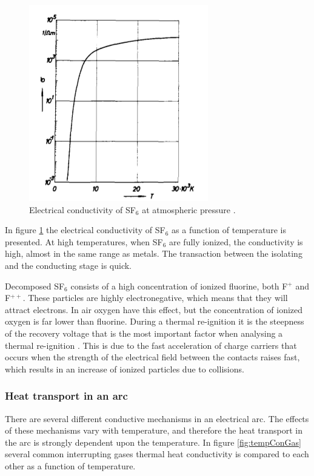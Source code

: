 \documentclass[10pt,a4paper,twoside]{article}
\begin{document}
\begin{figure}[H]
\centering
\includegraphics[scale=0.5]{Bilder/Theory/SF6Conduct.png}
\caption{Electrical conductivity of SF$_6$ at atmospheric pressure \cite{bib:IPSF6AQM}.} \label{fig:condSF6}
\end{figure}

In figure \ref{fig:condSF6} the electrical conductivity of SF$_6$ as a function of temperature is presented. At high temperatures, when SF$_6$ are fully ionized, the conductivity is high, almost in the same range as metals. The transaction between the isolating and the conducting stage is quick. 

Decomposed SF$_6$ consists of a high concentration of ionized fluorine, both F$^{+}$ and F$^{++}$. These particles are highly electronegative, which means that they will attract electrons. In air oxygen have this effect, but the concentration of ionized oxygen is far lower than fluorine. During a thermal re-ignition it is the steepness of the recovery voltage that is the most important factor when analysing a thermal re-ignition \cite{bib:HVEbreak}. This is due to the fast acceleration of charge carriers that occurs when the strength of the electrical field between the contacts raises fast, which results in an increase of ionized particles due to collisions. 
   
\subsubsection{Heat transport in an arc} \label{sec:HeatTransport}
There are several different conductive mechanisms in an electrical arc. The effects of these mechanisms vary with temperature, and therefore the heat transport in the arc is strongly dependent upon the temperature. In figure \ref{fig:tempConGas} several common interrupting gases thermal heat conductivity is compared to each other as a function of temperature.
\end{document}
